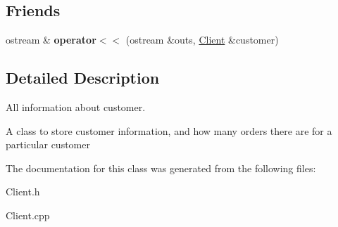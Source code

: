 \subsection*{Friends}
\begin{CompactItemize}
\item 
\hypertarget{class_client_64803615eb7966ae94302c481d29acdc}{
ostream \& {\bf operator$<$$<$} (ostream \&outs, \hyperlink{class_client}{Client} \&customer)}
\label{class_client_64803615eb7966ae94302c481d29acdc}

\end{CompactItemize}


\subsection{Detailed Description}
All information about customer. 

A class to store customer information, and how many orders there are for a particular customer 



The documentation for this class was generated from the following files:\begin{CompactItemize}
\item 
Client.h\item 
Client.cpp\end{CompactItemize}
